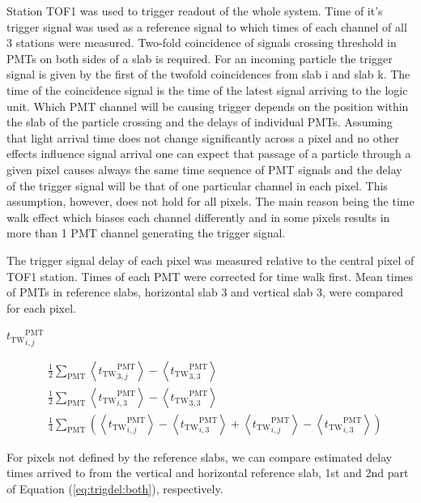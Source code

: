 Station TOF1 was used to trigger readout of the whole system. Time of
it's trigger signal was used as a reference signal to which times of
each channel of all 3 stations were measured. Two-fold coincidence of signals
crossing threshold in PMTs on both sides of a slab is required.
%
For an incoming particle the trigger signal is given by the first of
the twofold coincidences from slab i and slab k. The time of the
coincidence signal is the time of the latest signal arriving to the
logic unit.
%
Which PMT channel will be causing trigger depends on the position
within the slab of the particle crossing and the \Tzero{} delays of
individual PMTs. Assuming that light arrival time does not change
significantly across a pixel and no other effects influence signal
arrival one can expect that passage of a particle through a given
pixel causes always the same time sequence of PMT signals and the
delay of the trigger signal will be that of one particular channel in
each pixel. This assumption, however, does not hold for all
pixels. The main reason being the time walk effect which biases each
channel differently and in some pixels results in more than 1 PMT
channel generating the trigger signal.

The trigger signal delay of each pixel was measured relative to the
central pixel of TOF1 station. Times of each PMT were corrected for
time walk first. Mean times of PMTs in reference slabs, horizontal
slab 3 and vertical slab 3, were compared for each pixel.

\newcommand{\TW}{\ensuremath{\text{TW}}}
\newcommand{\PMT}{\ensuremath{\text{PMT}}}
${t_\TW}_{i,j}^\PMT$

{
\newcommand{\ttrig}[3]{\ensuremath{{t_\TW}_{#2,#3}^{#1}}}
\newcommand{\mean}[1]{\ensuremath{\left< #1 \right>}}
\begin{align}
  &\frac12\sum_{\PMT}
    \mean{\ttrig{\PMT}{3}{j}} -
    \mean{\ttrig{\PMT}{3}{3}} \label{eq:trigdel:horiz} \\
  &\frac12\sum_{\PMT}
    \mean{\ttrig{\PMT}{i}{3}} -
    \mean{\ttrig{\PMT}{3}{3}} \label{eq:trigdel:vert} \\
  &\frac14\sum_{\PMT}
    \left(
    \mean{\ttrig{\PMT}{i}{j}} - \mean{\ttrig{\PMT}{i}{3}} +
    \mean{\ttrig{\PMT}{i}{j}} - \mean{\ttrig{\PMT}{i}{3}}
    \right) \label{eq:trigdel:both}
\end{align}
}

For pixels not defined by the reference slabs, we can compare
estimated delay times  arrived to from the
vertical and horizontal reference slab, 1st and 2nd part of Equation
(\ref{eq:trigdel:both}), respectively.

